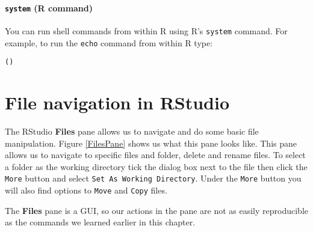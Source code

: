 \paragraph{{\tt{system}} (R command)}

You can run shell commands from within R using R's \texttt{system} command. For example, to run the \texttt{echo} command from within R type:

\begin{knitrout}
\color{fgcolor}\begin{kframe}
\begin{alltt}
()
\end{alltt}
\end{kframe}
\end{knitrout}



\section{File navigation in RStudio}

The RStudio \textbf{Files} pane allows us to navigate and do some basic file manipulation. Figure \ref{FilesPane} shows us what this pane looks like. This pane allows us to navigate to specific files and folder, delete and rename files. To select a folder as the working directory tick the dialog box next to the file then click the \texttt{More} button and select \texttt{Set As Working Directory}. Under the \texttt{More} button you will also find options to \texttt{Move} and \texttt{Copy} files.

The \textbf{Files} pane is a GUI, so our actions in the  pane are not as easily reproducible as the commands we learned earlier in this chapter. 

